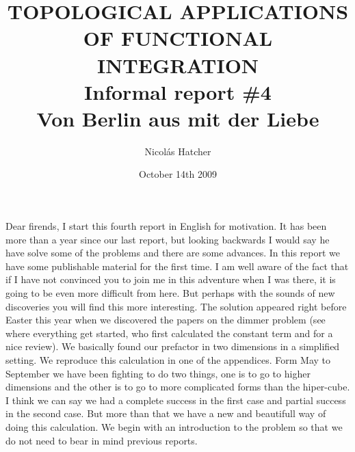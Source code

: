 \documentclass[12pt]{article}
\title{TOPOLOGICAL APPLICATIONS OF FUNCTIONAL INTEGRATION\\ Informal report \#4\\ Von Berlin aus mit der Liebe}
\author{Nicol{\'a}s Hatcher}
\date{October 14th 2009}
\begin{document}
\maketitle
\tableofcontents
\newpage
Dear firends, I start this fourth report in English for motivation. It has been more than a year since our last report, but looking backwards I would say he have solve some of the problems and there are some advances. In this report we have some publishable material for the first time. I am well aware of the fact that if I have not convinced you to join me in this adventure when I was there, it is going to be even more difficult from here. But perhaps with the sounds of new discoveries you will find this more interesting.
The solution appeared right before Easter this year when we discovered the papers on the dimmer problem (see \cite{Kas} where everything get started, \cite{Fer} who first calculated the constant term and \cite{DupDav} for a nice review). We basically found our prefactor in two dimensions in a simplified setting. We reproduce this calculation in one of the appendices. Form May to September we have been fighting to do two things, one is to go to higher dimensions and the other is to go to more complicated forms than the hiper-cube. I think we can say we had a complete success in the first case and partial success in the second case. But more than that we have a new and beautifull way of doing this calculation. We begin with an introduction to the problem so that we do not need to bear in mind previous reports.
\end{document}

